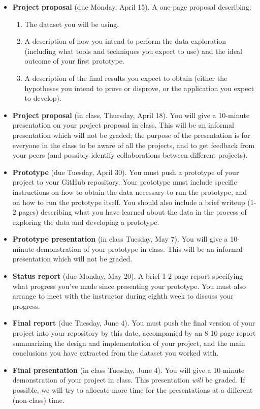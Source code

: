 \documentclass[11pt]{article}
\begin{document}
\begin{itemize}
 \item \textbf{Project proposal} (due Monday, April 15). A one-page proposal
describing:

\begin{enumerate}
\item The dataset you will be using.
\item A description of how you intend to perform the data exploration 
(including what tools and techniques you expect to use)
and the ideal outcome of your first prototype.
\item A description of the final results you expect to obtain (either
the hypotheses you intend to prove or disprove, or the application
you expect to develop).
\end{enumerate}

 \item \textbf{Project proposal} (in class, Thursday, April 18). You
will give a 10-minute presentation on your project proposal in class.
This will be an informal presentation which will not be graded; the
purpose of the presentation is for everyone in the class to be aware
of all the projects, and to get feedback from your peers (and possibly
identify collaborations between different projects).

 \item \textbf{Prototype} (due Tuesday, April 30). You must push
a prototype of your project to your GitHub repository. Your prototype
must include specific instructions on how to obtain the data necessary
to run the prototype, and on how to run the prototype itself. You
should also include a brief writeup (1-2 pages) describing what
you have learned about the data in the process of exploring the data
and developing a prototype.

 \item \textbf{Prototype presentation} (in class Tuesday, May 7).
You will give a 10-minute demonstration of your prototype in class.
This will be an informal presentation which will not be graded. 

 \item \textbf{Status report} (due Monday, May 20). A brief 1-2 page 
report specifying what progress you've made since presenting your prototype. 
You must also arrange to meet with the instructor during eighth week
to discuss your progress.

 \item \textbf{Final report} (due Tuesday, June 4). You must push
the final version of your project into your repository by this date,
accompanied by an 8-10 page report summarizing the design and implementation
of your project, and the main conclusions you have extracted from the
dataset you worked with. 

 \item \textbf{Final presentation} (in class Tuesday, June 4).
You will give a 10-minute demonstration of your project in class.
This presentation \emph{will} be graded. If possible, we will try
to allocate more time for the presentations at a different (non-class)
time.

\end{itemize}
\end{document}
